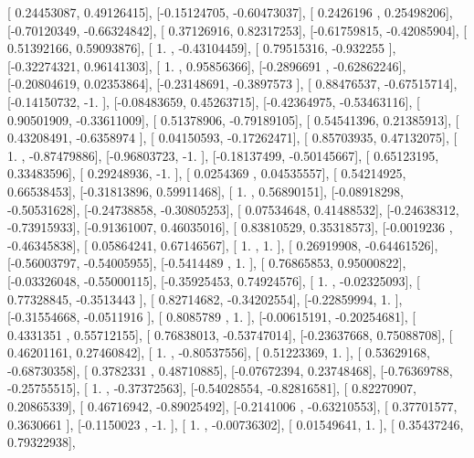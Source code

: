 \documentclass{article}
\begin{document}
       [ 0.24453087,  0.49126415],
       [-0.15124705, -0.60473037],
       [ 0.2426196 ,  0.25498206],
       [-0.70120349, -0.66324842],
       [ 0.37126916,  0.82317253],
       [-0.61759815, -0.42085904],
       [ 0.51392166,  0.59093876],
       [ 1.        , -0.43104459],
       [ 0.79515316, -0.932255  ],
       [-0.32274321,  0.96141303],
       [ 1.        ,  0.95856366],
       [-0.2896691 , -0.62862246],
       [-0.20804619,  0.02353864],
       [-0.23148691, -0.3897573 ],
       [ 0.88476537, -0.67515714],
       [-0.14150732, -1.        ],
       [-0.08483659,  0.45263715],
       [-0.42364975, -0.53463116],
       [ 0.90501909, -0.33611009],
       [ 0.51378906, -0.79189105],
       [ 0.54541396,  0.21385913],
       [ 0.43208491, -0.6358974 ],
       [ 0.04150593, -0.17262471],
       [ 0.85703935,  0.47132075],
       [ 1.        , -0.87479886],
       [-0.96803723, -1.        ],
       [-0.18137499, -0.50145667],
       [ 0.65123195,  0.33483596],
       [ 0.29248936, -1.        ],
       [ 0.0254369 ,  0.04535557],
       [ 0.54214925,  0.66538453],
       [-0.31813896,  0.59911468],
       [ 1.        ,  0.56890151],
       [-0.08918298, -0.50531628],
       [-0.24738858, -0.30805253],
       [ 0.07534648,  0.41488532],
       [-0.24638312, -0.73915933],
       [-0.91361007,  0.46035016],
       [ 0.83810529,  0.35318573],
       [-0.0019236 , -0.46345838],
       [ 0.05864241,  0.67146567],
       [ 1.        ,  1.        ],
       [ 0.26919908, -0.64461526],
       [-0.56003797, -0.54005955],
       [-0.5414489 ,  1.        ],
       [ 0.76865853,  0.95000822],
       [-0.03326048, -0.55000115],
       [-0.35925453,  0.74924576],
       [ 1.        , -0.02325093],
       [ 0.77328845, -0.3513443 ],
       [ 0.82714682, -0.34202554],
       [-0.22859994,  1.        ],
       [-0.31554668, -0.0511916 ],
       [ 0.8085789 ,  1.        ],
       [-0.00615191, -0.20254681],
       [ 0.4331351 ,  0.55712155],
       [ 0.76838013, -0.53747014],
       [-0.23637668,  0.75088708],
       [ 0.46201161,  0.27460842],
       [ 1.        , -0.80537556],
       [ 0.51223369,  1.        ],
       [ 0.53629168, -0.68730358],
       [ 0.3782331 ,  0.48710885],
       [-0.07672394,  0.23748468],
       [-0.76369788, -0.25755515],
       [ 1.        , -0.37372563],
       [-0.54028554, -0.82816581],
       [ 0.82270907,  0.20865339],
       [ 0.46716942, -0.89025492],
       [-0.2141006 , -0.63210553],
       [ 0.37701577,  0.3630661 ],
       [-0.1150023 , -1.        ],
       [ 1.        , -0.00736302],
       [ 0.01549641,  1.        ],
       [ 0.35437246,  0.79322938],
\end{document}
